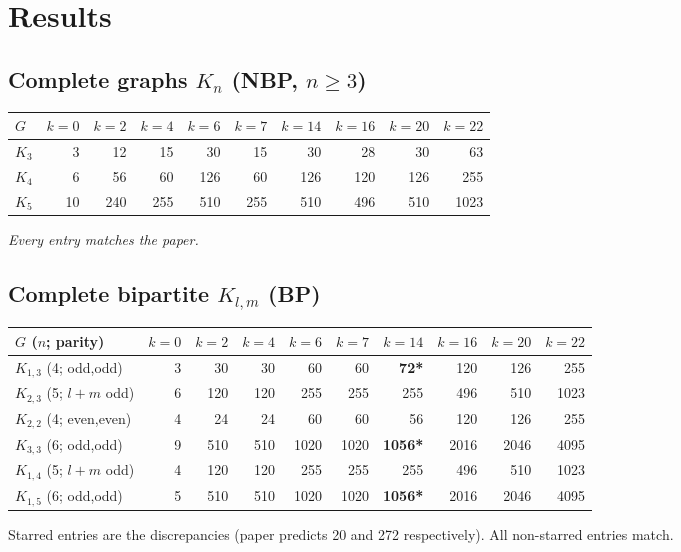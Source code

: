 \documentclass[11pt]{article}
\begin{document}
\section{Results}

\subsection{Complete graphs $K_n$ (NBP, $n\ge 3$)}

\begin{center}\small
\begin{tabular}{lrrrrrrrrr}
\toprule
$G$ & $k{=}0$ & $k{=}2$ & $k{=}4$ & $k{=}6$ & $k{=}7$ & $k{=}14$ & $k{=}16$ & $k{=}20$ & $k{=}22$ \\
\midrule
$K_3$ & 3    & 12   & 15   & 30   & 15   & 30   & 28   & 30   & 63 \\
$K_4$ & 6    & 56   & 60   & 126  & 60   & 126  & 120  & 126  & 255 \\
$K_5$ & 10   & 240  & 255  & 510  & 255  & 510  & 496  & 510  & 1023 \\
\bottomrule
\end{tabular}
\end{center}
\emph{Every entry matches the paper.}

\subsection{Complete bipartite $K_{l,m}$ (BP)}

\begin{center}\small
\begin{tabular}{lrrrrrrrrr}
\toprule
$G$ ($n$; parity) & $k{=}0$ & $k{=}2$ & $k{=}4$ & $k{=}6$ & $k{=}7$ & $k{=}14$ & $k{=}16$ & $k{=}20$ & $k{=}22$ \\
\midrule
$K_{1,3}$ (4; odd,odd) & 3   & 30   & 30   & 60   & 60   & \textbf{72*} & 120  & 126  & 255 \\
$K_{2,3}$ (5; $l{+}m$ odd) & 6   & 120  & 120  & 255  & 255  & 255  & 496  & 510  & 1023 \\
$K_{2,2}$ (4; even,even) & 4   & 24   & 24   & 60   & 60   & 56   & 120  & 126  & 255 \\
$K_{3,3}$ (6; odd,odd) & 9   & 510  & 510  & 1020 & 1020 & \textbf{1056*} & 2016 & 2046 & 4095 \\
$K_{1,4}$ (5; $l{+}m$ odd) & 4   & 120  & 120  & 255  & 255  & 255  & 496  & 510  & 1023 \\
$K_{1,5}$ (6; odd,odd) & 5   & 510  & 510  & 1020 & 1020 & \textbf{1056*} & 2016 & 2046 & 4095 \\
\bottomrule
\end{tabular}
\end{center}
Starred entries are the discrepancies (paper predicts 20 and 272 respectively). All non-starred entries match.
\end{document}
